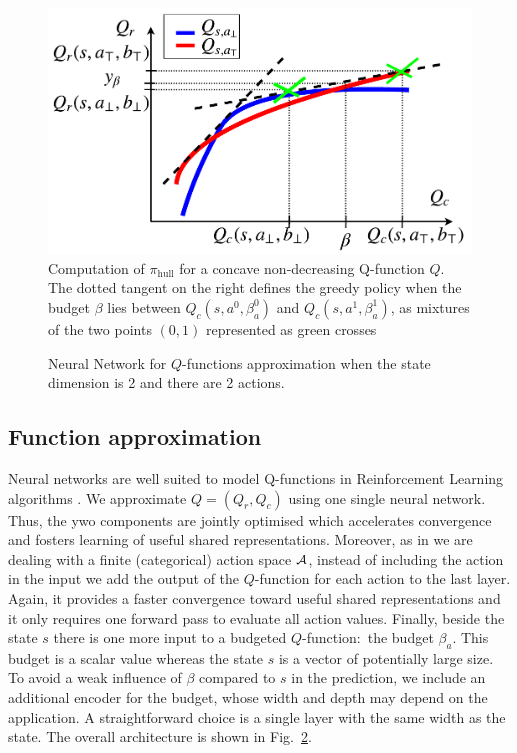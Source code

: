 \documentclass{article}
\begin{document}
\begin{minipage}[t]{0.5\textwidth}
\vspace{0pt}
\begin{figure}[H]
    \centering
    \includegraphics[width=\linewidth]{source/img/qrqc}
    \caption{Computation of $\pi_\text{hull}$ for a concave non-decreasing Q-function $Q$. The dotted tangent on the right defines the greedy policy when the budget $\beta$ lies between $Q_c(s,a^0,\beta_a^0)$ and $Q_c(s,a^1,\beta_a^1)$, as mixtures of the two points $(0, 1)$ represented as green crosses}
    \label{fig:hull}
\end{figure}
\end{minipage}
\begin{minipage}[t]{0.5\textwidth}
\begin{figure}[H]
    \centering
    
    \caption{Neural Network for $Q$-functions approximation when the state dimension is 2 and there are 2 actions.}
    \label{fig:architecture}
\end{figure}
\end{minipage}

\subsection{Function approximation}

Neural networks are well suited to model Q-functions in Reinforcement Learning algorithms \citep{Riedmiller2005,Mnih2015}.  We approximate $Q = (Q_r, Q_c)$ using one single neural network. Thus, the ywo components are jointly optimised which accelerates convergence and fosters learning of useful shared representations. Moreover, as in \citep{Mnih2015} we are dealing with a finite (categorical) action space $\mathcal{A}$, instead of including the action in the input we add the output of the $Q$-function for each action to the last layer. Again, it provides a faster convergence toward useful shared representations and it only requires one forward pass to evaluate all action values. Finally, beside the state $s$ there is one more input to a budgeted $Q$-function:~the budget $\beta_a$. This budget is a scalar value whereas the state $s$ is a vector of potentially large size. To avoid a weak influence of $\beta$ compared to $s$ in the prediction, we include an additional encoder for the budget, whose width and depth may depend on the application. A straightforward choice is a single layer with the same width as the state. The overall architecture is shown in Fig.~\ref{fig:architecture}.
\end{document}
